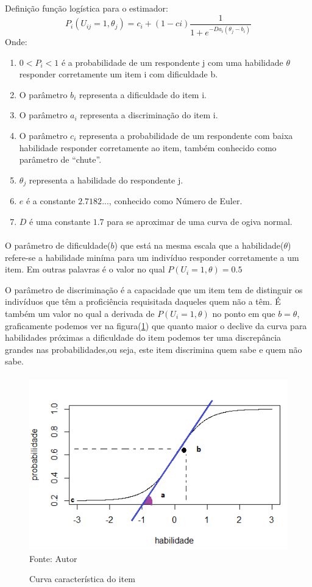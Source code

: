     	\noindent Definição função logística para o estimador:\\
	\begin{equation}
		P_i(U_{ij} = 1,\theta_j) = c_i + (1-ci)\displaystyle\frac{1}{1 + e^{-Da_i(\theta_j - b_i)}}
	\end{equation}
	    Onde:\\
	\begin{enumerate}[noitemsep]
	    \item[]  $0 < P_i < 1$ é a probabilidade de um respondente j com uma habilidade $\theta$ responder corretamente um item i com dificuldade b.
	    \item[] O parâmetro $b_i$  representa a dificuldade do   item i.
	    \item[] O parâmetro $a_i$ representa a discriminação do item i.
	    \item[] O parâmetro $c_i$ representa a probabilidade de um respondente com baixa habilidade responder corretamente ao item,  também conhecido como parâmetro de “chute”.
	    \item[] $\theta_j$ representa  a habilidade do respondente j.
	    \item[] $e$ é a constante $2.7182...$, conhecido como Número de Euler.
    	\item[] $D$  é uma constante $1.7$ para se aproximar de uma curva de ogiva normal. 
	\end{enumerate}
	\paragraph{}
    	O parâmetro de dificuldade($b$) que está na mesma escala que a habilidade($\theta$) refere-se a habilidade miníma para um indivíduo responder corretamente a um item. Em outras palavras é o valor no qual $P(U_i = 1, \theta)  = 0.5$
    \par
	    O parâmetro de discriminação é a capacidade que um item tem de distinguir os indivíduos que têm a proficiência requisitada daqueles quem não a têm. É também um valor no qual a derivada de $P(U_i = 1, \theta )$  no ponto em que $b = \theta$, graficamente podemos ver na figura(\ref{fig:Rplo2}) que quanto maior o declive da curva para habilidades próximas a dificuldade do item podemos ter uma discrepância grandes nas probabilidades,ou seja, este  item discrimina quem sabe e quem não sabe.
	\paragraph{}
	\begin{figure}[!h]
	    \centering
	    \caption{Curva característica do item}
	    \includegraphics[width=0.48\linewidth]{img/Rplo2}\\
	    Fonte: Autor
	    \label{fig:Rplo2}
	\end{figure}
